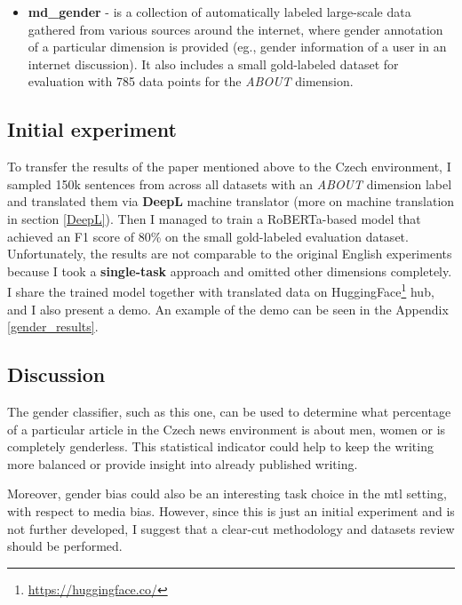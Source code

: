 \newpage

\begin{itemize}
\item \textbf{md\_gender} - is a collection of automatically labeled large-scale data gathered from various sources around the internet, where gender annotation of a particular dimension is provided (eg., gender information of a user in an internet discussion). It also includes a small gold-labeled dataset for evaluation with 785 data points for the \textit{ABOUT} dimension.
\end{itemize}

\subsection{Initial experiment}
To transfer the results of the paper mentioned above to the Czech environment, I sampled 150k sentences from across all datasets with an \textit{ABOUT} dimension label and translated them via \textbf{DeepL} machine translator (more on machine translation in section \ref{DeepL}). Then I managed to train a RoBERTa-based model \cite{liu2019roberta} that achieved an F1 score of 80\% on the small gold-labeled evaluation dataset. 
Unfortunately, the results are not comparable to the original English experiments because I took a \textbf{single-task} approach and omitted other dimensions completely. I share the trained model together with translated data on HuggingFace\footnote{\url{https://huggingface.co/}} hub, and I also present a demo. An example of the demo can be seen in the Appendix \ref{gender_results}.


\subsection{Discussion}
The gender classifier, such as this one, can be used to determine what percentage of a particular article in the Czech news environment is about men, women or is completely genderless. This statistical indicator could help to keep the writing more balanced or provide insight into already published writing.

Moreover, gender bias could also be an interesting task choice in the \gls{mtl} setting, with respect to media bias. However, since this is just an initial experiment and is not further developed, I suggest that a clear-cut methodology and datasets review should be performed. 



